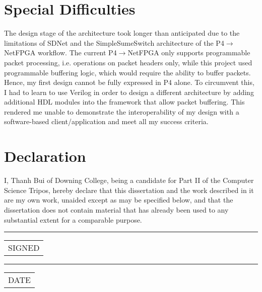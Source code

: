\section*{Special Difficulties}
The design stage of the architecture took longer than anticipated due to the limitations of SDNet and the SimpleSumeSwitch architecture of the P4$\rightarrow$NetFPGA workflow. The current P4$\rightarrow$NetFPGA only supports programmable packet processing, i.e. operations on packet headers only, while this project used programmable buffering logic, which would require the ability to buffer packets. Hence, my first design cannot be fully expressed in P4 alone. To circumvent this, I had to learn to use Verilog in order to design a different architecture by adding additional HDL modules into the framework that allow packet buffering. This rendered me unable to demonstrate the interoperability of my design with a software-based client/application and meet all my success criteria.


\newpage
\section*{Declaration}

I, Thanh Bui of Downing College, being a candidate for Part II of the Computer Science Tripos, hereby declare that this dissertation and the work described in it are my own work, unaided except as may be specified below, and that the dissertation does not contain material that has already been used to any substantial extent for a comparable purpose.

\begin{minipage}[t]{0.4\textwidth}
	\vspace*{1.5cm}  %
	\hrule
	\vspace{1mm} %
	\begin{tabular}[t]{l}
		SIGNED
	\end{tabular}
\end{minipage} 
\hspace{2cm}
\begin{minipage}[t]{0.4\textwidth}
	\vspace*{1.5cm}  %
	\hrule
	\vspace{1mm} %
	\begin{tabular}[t]{l}
		DATE
	\end{tabular}
\end{minipage}